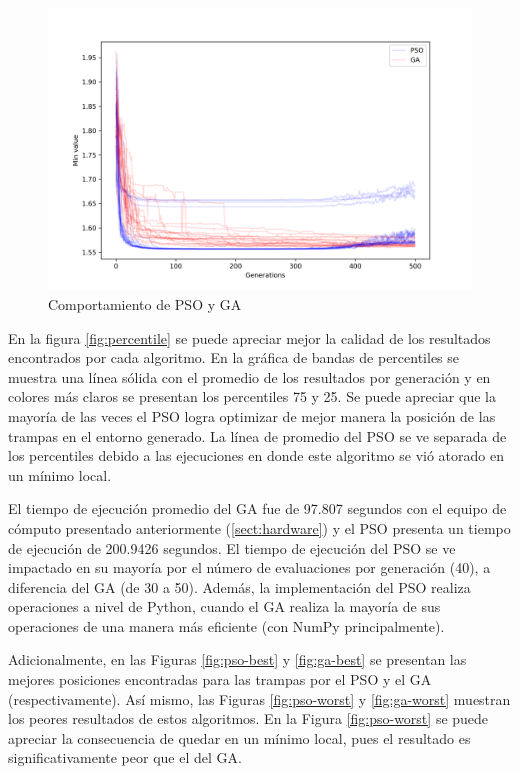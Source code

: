 \documentclass[letterpaper]{report}
\begin{document}
    \begin{figure}[ht!]
      \centering
      \includegraphics[width=\textwidth]{average-results.png}
      \caption{Comportamiento de PSO y GA}
      \label{fig:average-results}
    \end{figure}

    En la figura \ref{fig:percentile} se puede apreciar mejor la calidad de los
    resultados encontrados por cada algoritmo. En la gráfica de bandas de
    percentiles se muestra una línea sólida con el promedio de los resultados
    por generación y en colores más claros se presentan los percentiles 75 y 25.
    Se puede apreciar que la mayoría de las veces el PSO logra optimizar de
    mejor manera la posición de las trampas en el entorno generado. La línea de
    promedio del PSO se ve separada de los percentiles debido a las ejecuciones
    en donde este algoritmo se vió atorado en un mínimo local.

    El tiempo de ejecución promedio del GA fue de 97.807 segundos con el equipo
    de cómputo presentado anteriormente (\ref{sect:hardware}) y el PSO presenta
    un tiempo de ejecución de 200.9426 segundos. El tiempo de ejecución del PSO
    se ve impactado en su mayoría por el número de evaluaciones por generación
    (40), a diferencia del GA (de 30 a 50). Además, la implementación del PSO
    realiza operaciones a nivel de Python, cuando el GA realiza la mayoría de
    sus operaciones de una manera más eficiente (con NumPy principalmente).

    Adicionalmente, en las Figuras \ref{fig:pso-best} y \ref{fig:ga-best} se
    presentan las mejores posiciones encontradas para las trampas por el PSO y
    el GA (respectivamente). Así mismo, las Figuras \ref{fig:pso-worst} y
    \ref{fig:ga-worst} muestran los peores resultados de estos algoritmos. En la
    Figura \ref{fig:pso-worst} se puede apreciar la consecuencia de quedar en un
    mínimo local, pues el resultado es significativamente peor que el del GA. 
\end{document}
